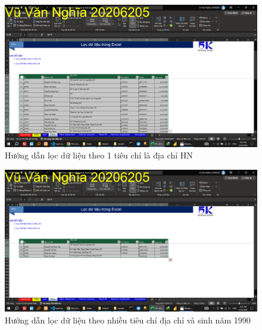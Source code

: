 \documentclass{article}
\begin{document}
\begin{figure}[h]
    \centering
    \includegraphics[scale = 0.15]{Video1/HuongDan/4.png}
    \caption{Hướng dẫn lọc dữ liệu theo 1 tiêu chí là địa chỉ HN}
\end{figure}
\begin{figure}[h]
    \centering
    \includegraphics[scale = 0.15]{Video1/HuongDan/5.png}
    \caption{Hướng dẫn lọc dữ liệu theo  nhiều tiêu chí địa chỉ và sinh năm 1990}
\end{figure}
\end{document}
